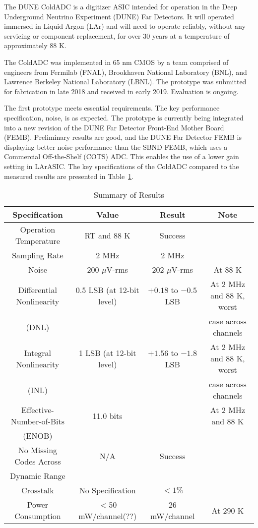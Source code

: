 \label{sec:1}

The DUNE ColdADC is a digitizer ASIC intended for operation in the Deep Underground Neutrino Experiment (DUNE) Far Detectors. It will operated immersed in Liquid Argon (LAr) and will need to operate reliably, without any servicing or component replacement, for over 30 years at a temperature of approximately 88 K. 

The ColdADC was implemented in 65 nm CMOS by a team comprised of engineers from Fermilab (FNAL), Brookhaven National Laboratory (BNL), and Lawrence Berkeley National Laboratory (LBNL). The prototype was submitted for fabrication in late 2018 and received in early 2019. Evaluation is ongoing. 

The first prototype meets essential requirements. The key performance specification, noise, is as expected. The prototype is currently being integrated into a new revision of the DUNE Far Detector Front-End Mother Board (FEMB). Preliminary results are good, and the DUNE Far Detector FEMB is displaying better noise performance than the SBND FEMB, which uses a Commercial Off-the-Shelf (COTS) ADC. This enables the use of a lower gain setting in LArASIC. The key specifications of the ColdADC compared to the measured results are presented in Table~\ref{tab:coldadc_specs}.
\begin{table}[h]
\centering
\begin{tabular}{|c|c|c|c|}
\hline
\textbf{ Specification } & \textbf{Value} & \textbf{Result} & \textbf{Note}  \\ \hline \hline
Operation Temperature &  RT and 88 K & Success & \\ \hline
Sampling Rate & 2 MHz & 2 MHz & \\ \hline
Noise & 200 $\mu$V-rms & 202 $\mu$V-rms & At 88 K \\ \hline
Differential Nonlinearity & 0.5 LSB (at 12-bit level) & $+0.18$ to $-0.5$ LSB & At 2 MHz and 88 K, worst \\
(DNL) & & & case across channels \\ \hline
Integral Nonlinearity & 1 LSB (at 12-bit level) & $+1.56$ to $-1.8$ LSB & At 2 MHz and 88 K, worst \\
(INL) & & & case across channels \\ \hline
Effective-Number-of-Bits & 11.0 bits & & At 2 MHz and 88 K \\ 
(ENOB) & & & \\ \hline
No Missing Codes Across & N/A & Success & \\ 
Dynamic Range & & & \\ \hline
Crosstalk  & No Specification & $<1\%$ & \\ \hline
Power Consumption & $<$50 mW/channel(??) & 26 mW/channel & At 290 K \\ \hline
\end{tabular}
\caption{Summary of Results}
\label{tab:coldadc_specs}
\end{table}

